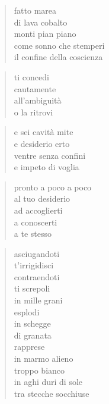 \clearpage



	\begin{verse}
		fatto marea\\
		di lava cobalto\\
		monti pian piano\\
		come sonno che stemperi\\
		il confine della coscienza
	\end{verse}

	\begin{verse}
		ti concedi\\
		cautamente\\
		all’ambiguità\\
		o la ritrovi
	\end{verse}

	\begin{verse}
		e sei cavità mite\\
		e desiderio erto\\
		ventre senza confini\\
		e impeto di voglia
	\end{verse}

	\begin{verse}
		pronto a poco a poco\\
		al tuo desiderio\\
		ad accoglierti\\
		a conoscerti\\
		a te stesso
	\end{verse}

\clearpage



	\begin{verse}
		asciugandoti\\
		t’irrigidisci\\
		contraendoti\\
		ti screpoli\\
		in mille grani\\
		esplodi\\
		in schegge\\
		di granata\\
		rapprese\\
		in marmo alieno\\
		troppo bianco\\
		in aghi duri di sole\\
		tra stecche socchiuse
	\end{verse}


